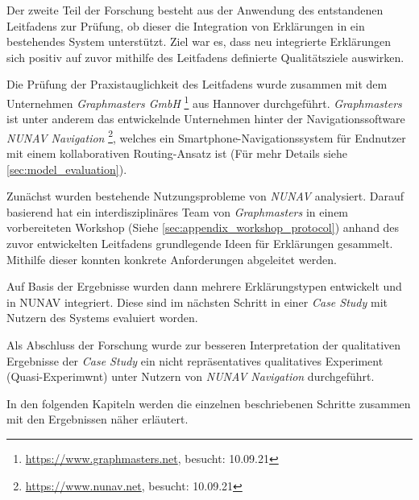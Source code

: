 \bigbreak

Der zweite Teil der Forschung besteht aus der Anwendung des entstandenen Leitfadens zur Prüfung, ob dieser die Integration von Erklärungen in ein bestehendes System unterstützt. Ziel war es, dass neu integrierte Erklärungen sich positiv auf zuvor mithilfe des Leitfadens definierte Qualitätsziele auswirken.

Die Prüfung der Praxistauglichkeit des Leitfadens wurde zusammen mit dem Unternehmen \textit{Graphmasters GmbH} \footnote{\url{https://www.graphmasters.net}, besucht: 10.09.21} aus Hannover durchgeführt. \textit{Graphmasters} ist unter anderem das entwickelnde Unternehmen hinter der Navigationssoftware \textit{NUNAV Navigation} \footnote{\url{https://www.nunav.net}, besucht: 10.09.21}, welches ein Smartphone-Navigationssystem für Endnutzer mit einem kollaborativen Routing-Ansatz ist (Für mehr Details siehe \autoref{sec:model_evaluation}).

Zunächst wurden bestehende Nutzungsprobleme von \textit{NUNAV} analysiert. Darauf basierend hat ein interdisziplinäres Team von \textit{Graphmasters} in einem vorbereiteten Workshop (Siehe \autoref{sec:appendix_workshop_protocol}) anhand des zuvor entwickelten Leitfadens grundlegende Ideen für Erklärungen gesammelt. Mithilfe dieser konnten konkrete Anforderungen abgeleitet werden.

Auf Basis der Ergebnisse wurden dann mehrere Erklärungstypen entwickelt und in NUNAV integriert. Diese sind im nächsten Schritt in einer \textit{Case Study} mit Nutzern des Systems evaluiert worden.

Als Abschluss der Forschung wurde zur besseren Interpretation der qualitativen Ergebnisse der \textit{Case Study} ein nicht repräsentatives qualitatives Experiment (Quasi-Experimwnt) unter Nutzern von \textit{NUNAV Navigation} durchgeführt.

\bigskip

In den folgenden Kapiteln werden die einzelnen beschriebenen Schritte zusammen mit den Ergebnissen näher erläutert.
